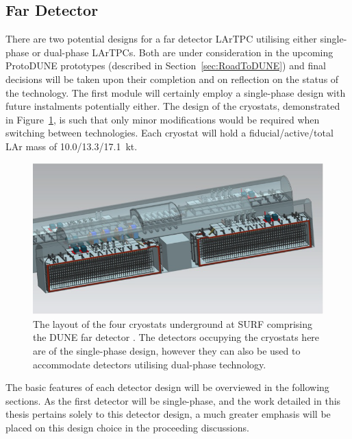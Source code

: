 \subsection{Far Detector}\label{sec:FarDetector}

There are two potential designs for a far detector LArTPC utilising either single-phase or dual-phase LArTPCs.  Both are under consideration in the upcoming ProtoDUNE prototypes (described in Section~\ref{sec:RoadToDUNE}) and final decisions will be taken upon their completion and on reflection on the status of the technology.  The first module will certainly employ a single-phase design with future instalments potentially either.  The design of the cryostats, demonstrated in Figure~\ref{fig:FDCryostats}, is such that only minor modifications would be required when switching between technologies.  Each cryostat will hold a fiducial/active/total LAr mass of 10.0/13.3/17.1~kt.

\begin{figure}
  \centering
  \includegraphics[width=12cm]{FDCryostats.png}
  \caption[The layout of the four cryostats underground at SURF comprising the DUNE far detector.]{The layout of the four cryostats underground at SURF comprising the DUNE far detector \cite{DUNECDR4}.  The detectors occupying the cryostats here are of the single-phase design, however they can also be used to accommodate detectors utilising dual-phase technology.}
  \label{fig:FDCryostats}
\end{figure}

The basic features of each detector design will be overviewed in the following sections.  As the first detector will be single-phase, and the work detailed in this thesis pertains solely to this detector design, a much greater emphasis will be placed on this design choice in the proceeding discussions.

